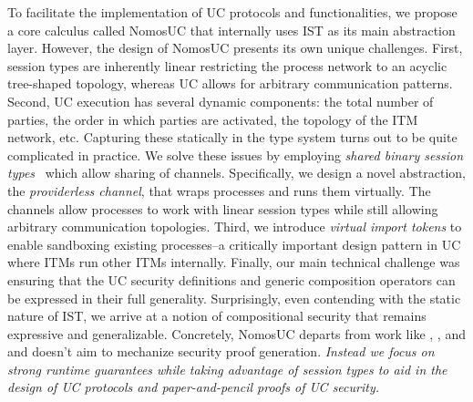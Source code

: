 To facilitate the implementation of UC protocols and functionalities, we propose a core calculus called NomosUC that
internally uses IST as its main abstraction layer.
However, the design of NomosUC presents its own unique challenges.
First, session types are inherently linear restricting the process network to an acyclic tree-shaped topology,
whereas UC allows for arbitrary communication patterns.
Second, UC execution has several dynamic components: the total number of parties, the order in which parties are activated,
the topology of the ITM network, etc.
Capturing these statically in the type system turns out to be quite complicated in practice.
We solve these issues by employing \emph{shared binary session types}~\cite{balzer2017manifest} which allow sharing
of channels. 
Specifically, we design a novel abstraction, the \emph{providerless channel}, that wraps processes and runs them virtually.
The channels allow processes to work with linear session types while still allowing arbitrary communication topologies.
Third, we introduce \emph{virtual import tokens} to enable sandboxing existing processes--a critically important design pattern in UC where ITMs run other ITMs internally.
Finally, our main technical challenge was ensuring that the UC security definitions and generic composition operators
can be expressed in their full generality.
Surprisingly, even contending with the static nature of IST, we arrive at a notion of compositional security that remains expressive and generalizable.
Concretely, NomosUC departs from work like \cite{easyuc}, \cite{barbosa}, and \cite{ipdl} and doesn't aim to mechanize security proof generation.
\emph{Instead we focus on strong runtime guarantees while taking advantage of session types to aid in the design of UC protocols and paper-and-pencil proofs of UC security.}


